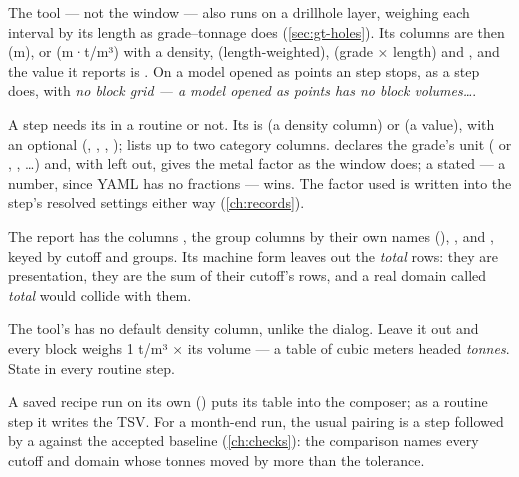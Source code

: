 The  tool — not the window — also runs on a drillhole layer, weighing each interval by its length as grade–tonnage does (\cref{sec:gt-holes}). Its columns are then  (m), or  (m·t/m³) with a density,  (length-weighted),  (grade × length) and , and the value it reports is . On a model opened as points an  step stops, as a  step does, with \emph{no block grid — a model opened as points has no block volumes…}.

A  step needs its  in a routine or not. Its  is  (a density column) or  (a value), with an optional  (, , , );  lists up to two category columns.  declares the grade's unit ( or \code{\%}, , …) and, with  left out, gives the metal factor as the window does; a stated  — a number, since YAML has no fractions — wins. The factor used is written into the step's resolved settings either way (\cref{ch:records}).

The  report has the columns , the group columns by their own names (), ,  and , keyed by cutoff and groups. Its machine form leaves out the \emph{total} rows: they are presentation, they are the sum of their cutoff's rows, and a real domain called \emph{total} would collide with them.

\begin{caution}
The  tool's  has no default density column, unlike the dialog. Leave it out and every block weighs 1 t/m³ × its volume — a table of cubic meters headed \emph{tonnes}. State  in every routine step.
\end{caution}

A saved  recipe run on its own () puts its table into the composer; as a routine step it writes the TSV. For a month-end run, the usual pairing is a  step followed by a  against the accepted baseline (\cref{ch:checks}): the comparison names every cutoff and domain whose tonnes moved by more than the tolerance.
